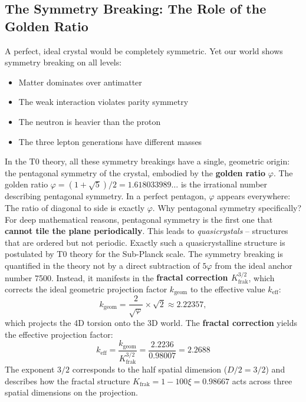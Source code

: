 	\subsection{The Symmetry Breaking: The Role of the Golden Ratio}
	A perfect, ideal crystal would be completely symmetric. Yet our world shows symmetry breaking on all levels:
	\begin{itemize}
		\item Matter dominates over antimatter
		\item The weak interaction violates parity symmetry
		\item The neutron is heavier than the proton
		\item The three lepton generations have different masses
	\end{itemize}
	In the T0 theory, all these symmetry breakings have a single, geometric origin: the pentagonal symmetry of the crystal, embodied by the \textbf{golden ratio} \(\varphi\).
	The golden ratio \(\varphi = (1+\sqrt{5})/2 = 1.618033989\ldots\) is the irrational number describing pentagonal symmetry. In a perfect pentagon, \(\varphi\) appears everywhere: The ratio of diagonal to side is exactly \(\varphi\).
	Why pentagonal symmetry specifically? For deep mathematical reasons, pentagonal symmetry is the first one that \textbf{cannot tile the plane periodically}. This leads to \emph{quasicrystals} – structures that are ordered but not periodic. Exactly such a quasicrystalline structure is postulated by T0 theory for the Sub-Planck scale.
	The symmetry breaking is quantified in the theory not by a direct subtraction of \(5\varphi\) from the ideal anchor number 7500. Instead, it manifests in the \textbf{fractal correction $K_\text{frak}^{3/2}$}, which corrects the ideal geometric projection factor \(k_\text{geom}\) to the effective value \(k_\text{eff}\):
	\begin{equation}
		k_\text{geom} = \frac{2}{\sqrt{\varphi}} \times \sqrt{2} \approx 2.22357,
	\end{equation}
	which projects the 4D torsion onto the 3D world. The \textbf{fractal correction} yields the effective projection factor:
	\begin{equation}
		k_\text{eff} = \frac{k_\text{geom}}{K_\text{frak}^{3/2}} = \frac{2.2236}{0.98007} = 2.2688
	\end{equation}
	The exponent $3/2$ corresponds to the half spatial dimension ($D/2 = 3/2$) and describes how the fractal structure $K_\text{frak} = 1 - 100\xi = 0.98667$ acts across three spatial dimensions on the projection.
	
